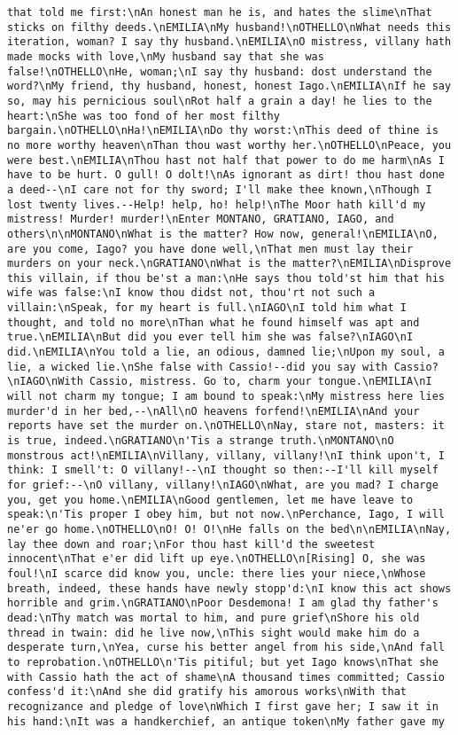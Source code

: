 \begin{verbatim}
that told me first:\nAn honest man he is, and hates the slime\nThat sticks on filthy deeds.\nEMILIA\nMy husband!\nOTHELLO\nWhat needs this iteration, woman? I say thy husband.\nEMILIA\nO mistress, villany hath made mocks with love,\nMy husband say that she was false!\nOTHELLO\nHe, woman;\nI say thy husband: dost understand the word?\nMy friend, thy husband, honest, honest Iago.\nEMILIA\nIf he say so, may his pernicious soul\nRot half a grain a day! he lies to the heart:\nShe was too fond of her most filthy bargain.\nOTHELLO\nHa!\nEMILIA\nDo thy worst:\nThis deed of thine is no more worthy heaven\nThan thou wast worthy her.\nOTHELLO\nPeace, you were best.\nEMILIA\nThou hast not half that power to do me harm\nAs I have to be hurt. O gull! O dolt!\nAs ignorant as dirt! thou hast done a deed--\nI care not for thy sword; I'll make thee known,\nThough I lost twenty lives.--Help! help, ho! help!\nThe Moor hath kill'd my mistress! Murder! murder!\nEnter MONTANO, GRATIANO, IAGO, and others\n\nMONTANO\nWhat is the matter? How now, general!\nEMILIA\nO, are you come, Iago? you have done well,\nThat men must lay their murders on your neck.\nGRATIANO\nWhat is the matter?\nEMILIA\nDisprove this villain, if thou be'st a man:\nHe says thou told'st him that his wife was false:\nI know thou didst not, thou'rt not such a villain:\nSpeak, for my heart is full.\nIAGO\nI told him what I thought, and told no more\nThan what he found himself was apt and true.\nEMILIA\nBut did you ever tell him she was false?\nIAGO\nI did.\nEMILIA\nYou told a lie, an odious, damned lie;\nUpon my soul, a lie, a wicked lie.\nShe false with Cassio!--did you say with Cassio?\nIAGO\nWith Cassio, mistress. Go to, charm your tongue.\nEMILIA\nI will not charm my tongue; I am bound to speak:\nMy mistress here lies murder'd in her bed,--\nAll\nO heavens forfend!\nEMILIA\nAnd your reports have set the murder on.\nOTHELLO\nNay, stare not, masters: it is true, indeed.\nGRATIANO\n'Tis a strange truth.\nMONTANO\nO monstrous act!\nEMILIA\nVillany, villany, villany!\nI think upon't, I think: I smell't: O villany!--\nI thought so then:--I'll kill myself for grief:--\nO villany, villany!\nIAGO\nWhat, are you mad? I charge you, get you home.\nEMILIA\nGood gentlemen, let me have leave to speak:\n'Tis proper I obey him, but not now.\nPerchance, Iago, I will ne'er go home.\nOTHELLO\nO! O! O!\nHe falls on the bed\n\nEMILIA\nNay, lay thee down and roar;\nFor thou hast kill'd the sweetest innocent\nThat e'er did lift up eye.\nOTHELLO\n[Rising] O, she was foul!\nI scarce did know you, uncle: there lies your niece,\nWhose breath, indeed, these hands have newly stopp'd:\nI know this act shows horrible and grim.\nGRATIANO\nPoor Desdemona! I am glad thy father's dead:\nThy match was mortal to him, and pure grief\nShore his old thread in twain: did he live now,\nThis sight would make him do a desperate turn,\nYea, curse his better angel from his side,\nAnd fall to reprobation.\nOTHELLO\n'Tis pitiful; but yet Iago knows\nThat she with Cassio hath the act of shame\nA thousand times committed; Cassio confess'd it:\nAnd she did gratify his amorous works\nWith that recognizance and pledge of love\nWhich I first gave her; I saw it in his hand:\nIt was a handkerchief, an antique token\nMy father gave my 
\end{verbatim}

